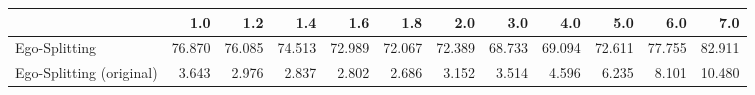 \begin{tabular}{lrrrrrrrrrrr}
\toprule
{} &    1.0 &    1.2 &    1.4 &    1.6 &    1.8 &    2.0 &    3.0 &    4.0 &    5.0 &    6.0 &    7.0 \\
\midrule
Ego-Splitting            & 76.870 & 76.085 & 74.513 & 72.989 & 72.067 & 72.389 & 68.733 & 69.094 & 72.611 & 77.755 & 82.911 \\
Ego-Splitting (original) &  3.643 &  2.976 &  2.837 &  2.802 &  2.686 &  3.152 &  3.514 &  4.596 &  6.235 &  8.101 & 10.480 \\
\bottomrule
\end{tabular}
